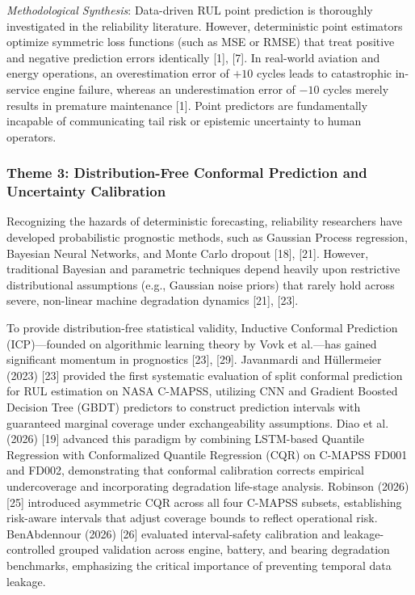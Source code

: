 \documentclass[12pt,a4paper]{article}
\begin{document}
\textit{Methodological Synthesis}: Data-driven RUL point prediction is thoroughly investigated in the reliability literature. However, deterministic point estimators optimize symmetric loss functions (such as MSE or RMSE) that treat positive and negative prediction errors identically [1], [7]. In real-world aviation and energy operations, an overestimation error of $+10$ cycles leads to catastrophic in-service engine failure, whereas an underestimation error of $-10$ cycles merely results in premature maintenance [1]. Point predictors are fundamentally incapable of communicating tail risk or epistemic uncertainty to human operators.

\subsubsection*{Theme 3: Distribution-Free Conformal Prediction and Uncertainty Calibration}
Recognizing the hazards of deterministic forecasting, reliability researchers have developed probabilistic prognostic methods, such as Gaussian Process regression, Bayesian Neural Networks, and Monte Carlo dropout [18], [21]. However, traditional Bayesian and parametric techniques depend heavily upon restrictive distributional assumptions (e.g., Gaussian noise priors) that rarely hold across severe, non-linear machine degradation dynamics [21], [23].

To provide distribution-free statistical validity, Inductive Conformal Prediction (ICP)—founded on algorithmic learning theory by Vovk et al.—has gained significant momentum in prognostics [23], [29]. Javanmardi and H{\"u}llermeier (2023) [23] provided the first systematic evaluation of split conformal prediction for RUL estimation on NASA C-MAPSS, utilizing CNN and Gradient Boosted Decision Tree (GBDT) predictors to construct prediction intervals with guaranteed marginal coverage under exchangeability assumptions. Diao et al. (2026) [19] advanced this paradigm by combining LSTM-based Quantile Regression with Conformalized Quantile Regression (CQR) on C-MAPSS FD001 and FD002, demonstrating that conformal calibration corrects empirical undercoverage and incorporating degradation life-stage analysis. Robinson (2026) [25] introduced asymmetric CQR across all four C-MAPSS subsets, establishing risk-aware intervals that adjust coverage bounds to reflect operational risk. BenAbdennour (2026) [26] evaluated interval-safety calibration and leakage-controlled grouped validation across engine, battery, and bearing degradation benchmarks, emphasizing the critical importance of preventing temporal data leakage.
\end{document}
